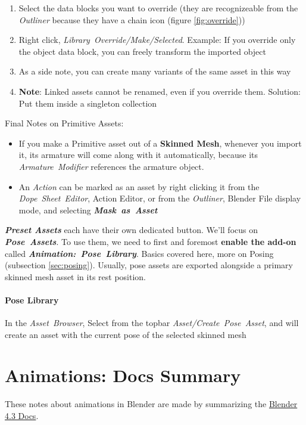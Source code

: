 \documentclass{article}
\begin{document}
\begin{enumerate}[noitemsep, topsep=0pt]
    \item Select the data blocks you want to override (they are recognizeable from the \mbox{\textit{Outliner}} because they have a chain icon (figure \ref{fig:override}))
    \item Right click, \mbox{\textit{Library Override/Make/Selected}}. Example: If you override only the object data block, you can freely transform the imported object
    \item As a side note, you can create many variants of the same asset in this way
    \item \textbf{Note}: Linked assets cannot be renamed, even if you override them. Solution: Put them inside a singleton collection
\end{enumerate}
Final Notes on Primitive Assets:
\begin{itemize}[noitemsep, topsep=0pt]
    \item If you make a Primitive asset out of a \textbf{Skinned Mesh}, whenever you import it, its armature will come along with it automatically, 
    because its \mbox{\textit{Armature Modifier}} references the armature object.
    \item An \textit{Action} can be marked as an asset by right clicking it from the \mbox{\textit{Dope Sheet Editor}}, Action Editor, or from the \textit{Outliner}, 
    Blender File display mode, and selecting \mbox{\textit{\textbf{Mask as Asset}}}
\end{itemize}
\textit{\textbf{Preset Assets}} each have their own dedicated button. We'll focus on \mbox{\textit{\textbf{Pose Assets}}}. To use them, we need to first and foremost 
\textbf{enable the add-on} called \mbox{\textit{\textbf{Animation: Pose Library}}}. Basics covered here, more on Posing (subsection \ref{sec:posing}). Usually, pose assets are exported 
alongside a primary skinned mesh asset in its rest position.
\paragraph{Pose Library}
In the \mbox{\textit{Asset Browser}}, Select from the topbar \mbox{\textit{Asset/Create Pose Asset}}, and will create an asset with the current pose of the selected skinned mesh

\section{Animations: Docs Summary}
These notes about animations in Blender are made by summarizing the \href{https://docs.blender.org/manual/en/4.3/animation/introduction.html}{Blender 4.3 Docs}.
\end{document}
